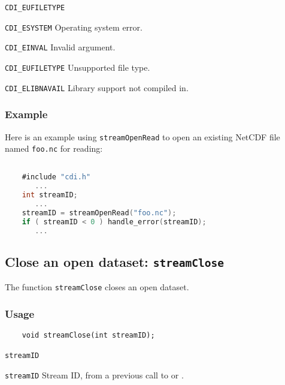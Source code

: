 \hspace*{4mm}\begin{minipage}[]{15cm}
\begin{deflist}{\texttt{CDI\_EUFILETYPE}\ }
\item[\texttt{CDI\_ESYSTEM}]
Operating system error.
\item[\texttt{CDI\_EINVAL}]
Invalid argument.
\item[\texttt{CDI\_EUFILETYPE}]
Unsupported file type.
\item[\texttt{CDI\_ELIBNAVAIL}]
Library support not compiled in.
\end{deflist}
\end{minipage}


\subsubsection*{Example}

Here is an example using {\texttt{streamOpenRead}} to open an existing NetCDF
file named {\texttt{foo.nc}} for reading:

\begin{lstlisting}[language=C, backgroundcolor=\color{pyellow}, basicstyle=\small, columns=flexible]

    #include "cdi.h"
       ...
    int streamID;
       ...
    streamID = streamOpenRead("foo.nc");
    if ( streamID < 0 ) handle_error(streamID);
       ...
\end{lstlisting}


\subsection{Close an open dataset: \texttt{streamClose}}
\label{streamClose}

The function {\texttt{streamClose}} closes an open dataset.

\subsubsection*{Usage}

\begin{verbatim}
    void streamClose(int streamID);
\end{verbatim}

\hspace*{4mm}\begin{minipage}[]{15cm}
\begin{deflist}{\texttt{streamID}\ }
\item[\texttt{streamID}]
Stream ID, from a previous call to {} or {}.

\end{deflist}
\end{minipage}


